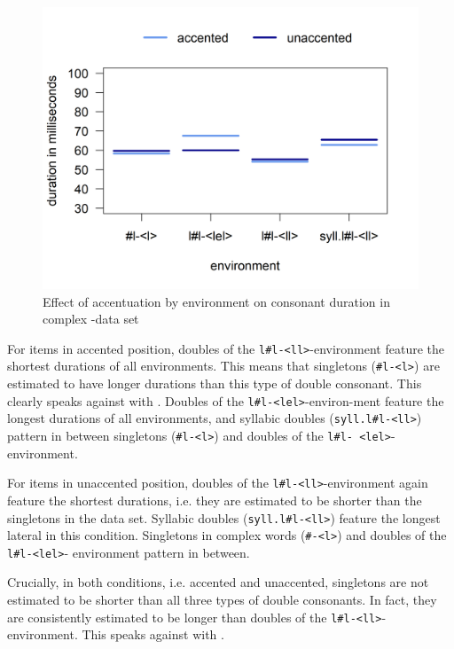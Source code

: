 \begin{figure}
	
	\includegraphics [scale=0.5] {images/Experiment/LyModelInterEnvAcc}
	\caption{Effect of accentuation by environment on consonant duration in complex -data set}
	\label{fig:Env Acc lyComplex experiment}
\end{figure}

For items in accented position, doubles of the \texttt{l\#l-<ll>}-environment feature the shortest durations of all environments. This means that singletons (\texttt{\#l-<l>}) are estimated to have longer durations than this type of double consonant. This clearly speaks against  with . Doubles of the \texttt{l\#l-<lel>}-environ-ment feature the longest durations of all environments, and syllabic doubles (\texttt{syll.l\#l-<ll>}) pattern in between singletons  (\texttt{\#l-<l>}) and doubles of the \texttt{l\#l- <lel>}- environment.


For items in unaccented position, doubles of the \texttt{l\#l-<ll>}-environment again feature the shortest durations, i.e. they are estimated to be shorter than the singletons in the data set. Syllabic doubles (\texttt{syll.l\#l-<ll>}) feature the longest lateral in this condition.  Singletons in complex words (\texttt{\#-<l>}) and doubles of the \texttt{l\#l-<lel>}- environment  pattern in between.

Crucially, in both conditions, i.e. accented and unaccented, singletons are not estimated to be shorter than all three types of double consonants. In fact, they are consistently estimated to be longer than doubles of the  \texttt{l\#l-<ll>}-environment. This speaks against  with .

